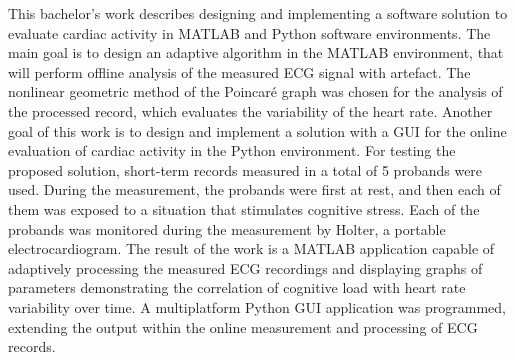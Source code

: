 This bachelor's work describes designing and implementing a software
solution to evaluate cardiac activity in MATLAB and Python
software environments. The main goal is to design an adaptive algorithm in the
MATLAB environment, that will perform offline analysis of the
measured ECG signal with artefact. The nonlinear geometric method of the
Poincaré graph was chosen for the analysis of the processed record, which
evaluates the variability of the heart rate. Another goal of this work is to
design and implement a solution with a GUI for the online evaluation of cardiac
activity in the Python environment. For testing the proposed solution,
short-term records measured in a total of 5 probands were used. During the
measurement, the probands were first at rest, and then each of them was exposed
to a situation that stimulates cognitive stress. Each of the probands was
monitored during the measurement by Holter, a portable electrocardiogram. The
result of the work is a MATLAB application capable of adaptively processing the
measured ECG recordings and displaying graphs of parameters demonstrating the
correlation of cognitive load with heart rate variability over time. A
multiplatform Python GUI application was programmed, extending the output within
the online measurement and processing of ECG records. 